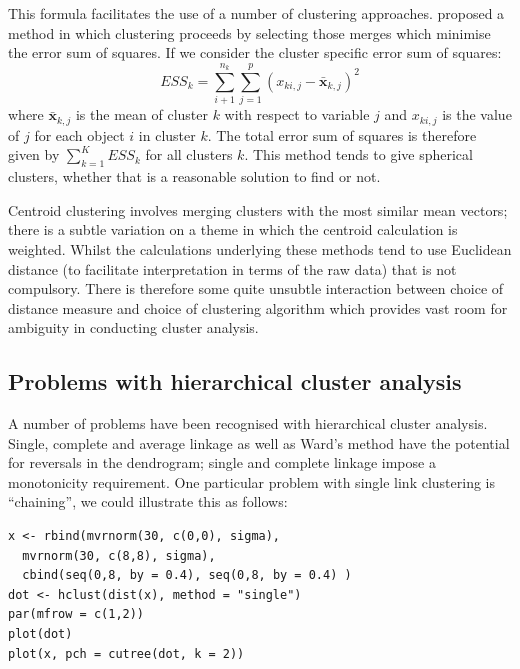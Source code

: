 This formula facilitates the use of a number of clustering approaches.   \cite{Ward:1963} proposed a method in which clustering proceeds by selecting those merges which minimise the error sum of squares.   If we consider the cluster specific error sum of squares:
\begin{displaymath}
ESS_{k} = \sum_{i+1}^{n_{k}} \sum_{j=1}^{p} (x_{ki,j} - \bar{\boldsymbol{x}}_{k,j})^{2}
\end{displaymath}
where $ \bar{\boldsymbol{x}}_{k,j}$ is the mean of cluster $k$ with respect to variable $j$ and $x_{ki,j}$ is the value of $j$ for each object $i$ in cluster $k$.   The total error sum of squares is therefore given by $\sum_{k=1}^{K} ESS_{k}$ for all clusters $k$.   This method tends to give spherical clusters, whether that is a reasonable solution to find or not.

 Centroid clustering involves merging clusters with the most similar mean vectors; there is a subtle variation on a theme in which the centroid calculation is weighted.   Whilst the calculations underlying these methods tend to use Euclidean distance (to facilitate interpretation in terms of the raw data) that is not compulsory.   There is therefore some quite unsubtle interaction between choice of distance measure and choice of clustering algorithm which provides vast room for ambiguity in conducting cluster analysis.


\subsection{Problems with hierarchical cluster analysis}

A number of problems have been recognised with hierarchical cluster analysis.   Single, complete and average linkage as well as Ward's method have the potential for reversals in the dendrogram; single and complete linkage impose a monotonicity requirement.   One particular problem with single link clustering is ``chaining'', we could illustrate this as follows:
\singlespacing
\begin{verbatim}
x <- rbind(mvrnorm(30, c(0,0), sigma), 
  mvrnorm(30, c(8,8), sigma), 
  cbind(seq(0,8, by = 0.4), seq(0,8, by = 0.4) )
dot <- hclust(dist(x), method = "single")
par(mfrow = c(1,2))
plot(dot)
plot(x, pch = cutree(dot, k = 2))
\end{verbatim}
\onehalfspacing


